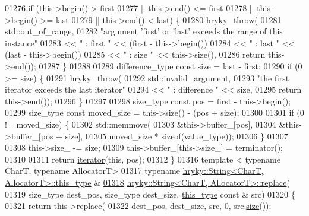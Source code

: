 \begin{DoxyCode}
01276     \textcolor{keywordflow}{if} (this->begin() > first
01277          || this->end() <= first
01278          || this->begin() >= last
01279          || this->end() < last) \{
01280         \hyperlink{debug__common_8h_af50606eac4009921527ddcaed392b2c2}{hryky_throw}(
01281             std::out\_of\_range,
01282             \textcolor{stringliteral}{"argument 'first' or 'last' exceeds the range of this instance"}
01283             << \textcolor{stringliteral}{" : first "} << (first - this->begin())
01284             << \textcolor{stringliteral}{" : last "} << (last - this->begin())
01285             << \textcolor{stringliteral}{" : size "} << this->size(),
01286             \textcolor{keywordflow}{return} this->end());
01287     \}
01288 
01289     difference\_type \textcolor{keyword}{const} size = last - first;
01290     \textcolor{keywordflow}{if} (0 >= size) \{
01291         \hyperlink{debug__common_8h_af50606eac4009921527ddcaed392b2c2}{hryky_throw}(
01292             std::invalid\_argument,
01293             \textcolor{stringliteral}{"the first iterator exceeds the last iterator"}
01294             << \textcolor{stringliteral}{" : difference "} << size,
01295             \textcolor{keywordflow}{return} this->end());
01296     \}
01297 
01298     size\_type \textcolor{keyword}{const} pos         = first - this->begin();
01299     size\_type \textcolor{keyword}{const} moved\_size  = this->size() - (pos + size);
01300 
01301     \textcolor{keywordflow}{if} (0 != moved\_size) \{
01302         std::memmove(
01303             &this->buffer\_[pos],
01304             &this->buffer\_[pos + size],
01305             moved\_size * \textcolor{keyword}{sizeof}(value\_type));
01306     \}
01307 
01308     this->size\_ -= size;
01309     this->buffer\_[this->size\_] = terminator();
01310 
01311     \textcolor{keywordflow}{return} \hyperlink{classhryky_1_1iterator_1_1random_1_1_mutable}{iterator}(\textcolor{keyword}{this}, pos);
01312 \}
01316 \textcolor{keyword}{template} < \textcolor{keyword}{typename} CharT, \textcolor{keyword}{typename} AllocatorT>
01317 \textcolor{keyword}{typename} \hyperlink{classhryky_1_1_string}{hryky::String<CharT, AllocatorT>::this_type} &
\hypertarget{string_8h_source_l01318}{}\hyperlink{classhryky_1_1_string_a09705c9ae9b2a6eb030421830be1a6ad}{01318} \hyperlink{classhryky_1_1_string}{hryky::String<CharT, AllocatorT>::replace}(
01319     size\_type dest\_pos, size\_type dest\_size, \hyperlink{classhryky_1_1_string}{this_type} \textcolor{keyword}{const} & src)
01320 \{
01321     \textcolor{keywordflow}{return} this->replace(
01322         dest\_pos, dest\_size, src, 0, src.\hyperlink{classhryky_1_1_string_a9db0f71dce7b2de86a54ab5323759265}{size}());

\end{DoxyCode}
